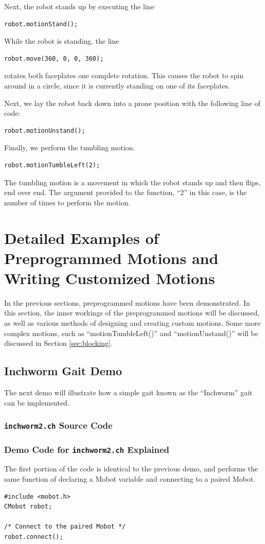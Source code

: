 \documentclass{article}
\begin{document}
Next, the robot stands up by executing the line
\begin{verbatim}
robot.motionStand();
\end{verbatim}

While the robot is standing, the line
\begin{verbatim}
robot.move(360, 0, 0, 360);
\end{verbatim}
rotates both faceplates one complete rotation. This causes the robot to spin around 
in a circle, since it is currently standing on one of its faceplates.

Next, we lay the robot back down into a prone position with the following line
of code:
\begin{verbatim}
robot.motionUnstand();
\end{verbatim}

Finally, we perform the tumbling motion. 
\begin{verbatim}
robot.motionTumbleLeft(2);
\end{verbatim}
The tumbling motion is a movement in which
the robot stands up and then flips, end over end. The argument provided to the
function, ``2'' in this case, is the number of times to perform the motion.

\section{Detailed Examples of Preprogrammed Motions and Writing Customized Motions}
In the previous sections, preprogrammed motions have been demonstrated. In this section,
the inner workings of the preprogrammed motions will be discussed, as well as various
methods of designing and creating custom motions. Some more complex motions, such as 
``motionTumbleLeft()'' and ``motionUnstand()'' will be discussed in Section \ref{sec:blocking}.
\subsection{Inchworm Gait Demo}
The next demo will illustrate how a simple gait known as the ``Inchworm'' gait 
can be implemented.

\subsubsection{\texttt{inchworm2.ch} Source Code}


\subsubsection{Demo Code for \texttt{inchworm2.ch} Explained}
The first portion of the code is identical to the previous demo, and performs
the same function of declaring a Mobot variable and connecting to a 
paired Mobot.
\begin{verbatim}
#include <mobot.h>
CMobot robot;

/* Connect to the paired Mobot */
robot.connect();
\end{verbatim}
\end{document}
